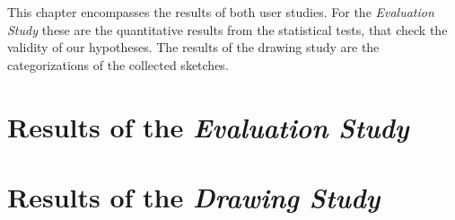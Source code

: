 This chapter encompasses the results of both user studies. For the \textit{Evaluation Study} these are the quantitative results from the statistical tests, that check the validity of our hypotheses. The results of the drawing study are the categorizations of the collected sketches.

\section{Results of the \textit{Evaluation Study}}
\label{ch:evaluationResults}



\section{Results of the \textit{Drawing Study}}
\label{ch:drawingResults}
